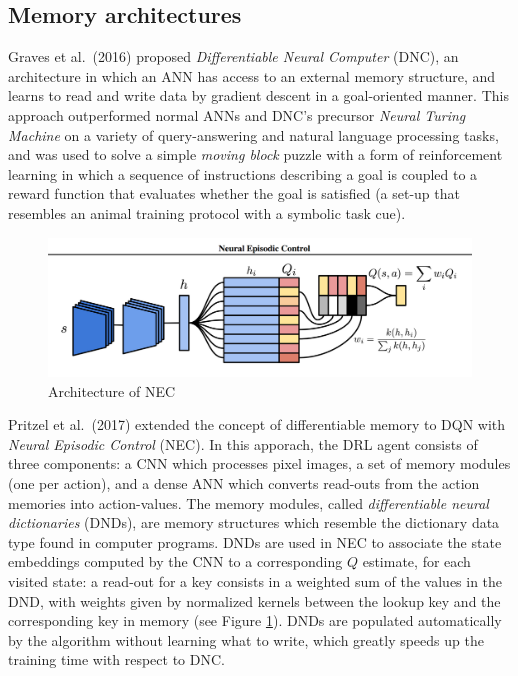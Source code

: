 \subsection{Memory architectures}
Graves et al.\ (2016) \cite{graves2016hybrid} proposed \textit{Differentiable 
Neural Computer} (DNC), an architecture in which an ANN has access to an 
external memory structure, and learns to read and write data by gradient descent
in a goal-oriented manner.
This approach outperformed normal ANNs and DNC's precursor \textit{Neural 
Turing Machine} \cite{gravesneural} on a variety of query-answering and natural 
language processing tasks, and was used to solve a simple \textit{moving block} 
puzzle with a form of reinforcement learning in which a sequence of instructions
describing a goal is coupled to a reward function that evaluates whether the 
goal is satisfied (a set-up that resembles an animal training protocol with a 
symbolic task cue).
%
\begin{figure}[h]
\includegraphics[width=\textwidth]{pictures/nec}
\centering
\caption{Architecture of NEC}
\label{i:nec}
\end{figure}
%

Pritzel et al.\ (2017) \cite{pritzel2017neural} extended the concept of 
differentiable memory to DQN with \textit{Neural Episodic Control} (NEC). 
In this apporach, the DRL agent consists of three components: a CNN which 
processes pixel images, a set of memory modules (one per action), and a dense 
ANN which converts read-outs from the action memories into action-values. The 
memory modules, called \textit{differentiable neural dictionaries} (DNDs), are 
memory structures which resemble the dictionary data type found in computer 
programs. DNDs are used in NEC to associate the state embeddings computed by the
CNN to a corresponding $Q$ estimate, for each visited state: a read-out for a 
key consists in a weighted sum of the values in the DND, with weights given by 
normalized kernels between the lookup key and the corresponding key in memory 
(see Figure \ref{i:nec}). 
DNDs are populated automatically by the algorithm without learning what to write,
which greatly speeds up the training time with respect to DNC.

